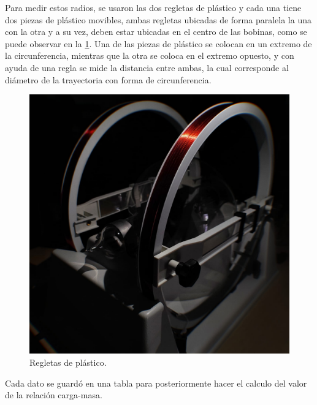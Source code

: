 Para medir estos radios, se usaron las dos regletas de plástico y cada una
tiene dos piezas de plástico movibles, ambas regletas ubicadas de forma paralela
la una con la otra y a su vez, deben estar ubicadas en el centro de las bobinas,
como se puede observar en la \cref{fig:reglas}.
Una de las piezas de plástico se colocan en un extremo de la circunferencia,
mientras que la otra se coloca en el extremo opuesto, y con ayuda de una regla
se mide la distancia entre ambas, la cual corresponde al diámetro de la
trayectoria con forma de circunferencia.

\begin{figure}[htbp!]
  \centering
  \includegraphics[width=0.8\linewidth]{./images/reglas.jpeg}
  \caption{Regletas de plástico.}
  \label{fig:reglas}
\end{figure}

Cada dato se guardó en una tabla para posteriormente hacer el calculo del valor
de la relación carga-masa.

